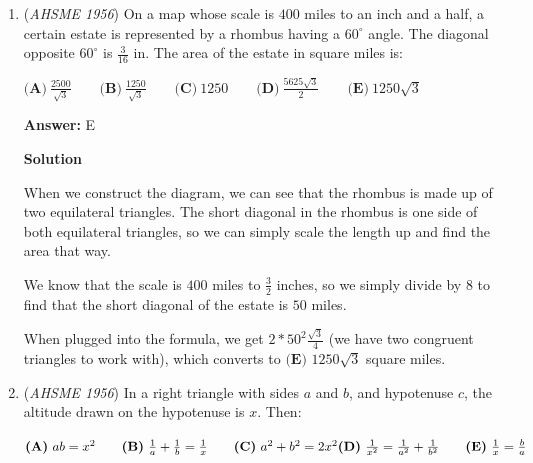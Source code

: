 \begin{enumerate}
 \textbf{Answer: }E



\textbf{Solution}

We can plug in 1, 8, and 49 to see which works.

 $1 = 1 = 1^2$
$1 + 2 + 3 + \cdots + 8 = \frac{8 \cdot 9}{2} = 36 = 6^2$
$1 + 2 + 3 + \cdots + 49 = \frac{49 \cdot 50}{2} = 1225 = 45^2$

 All of these values produce a perfect square for $1 + 2 + \cdots + K,$ so the answer is $\boxed{\textbf{(E)}}.$

 -coolmath34

 


	\item (\textit{AHSME 1956}) On a map whose scale is $400$ miles to an inch and a half, a certain estate is represented by a 
rhombus having a $60^{\circ}$ angle. The diagonal opposite $60^{\circ}$ is $\frac {3}{16}$ in. The area of the estate in square miles is: 


 $\textbf{(A)}\ \frac{2500}{\sqrt{3}}\qquad \textbf{(B)}\ \frac{1250}{\sqrt{3}}\qquad \textbf{(C)}\ 1250\qquad \textbf{(D)}\ \frac{5625\sqrt{3}}{2}\qquad \textbf{(E)}\ 1250\sqrt{3}$

 \textbf{Answer: }E



\textbf{Solution}

When we construct the diagram, we can see that the rhombus is made up of two equilateral triangles. The short diagonal in the rhombus is one side of both equilateral triangles, so we can simply scale the length up and find the area that way.

 We know that the scale is $400$ miles to $\frac{3}{2}$ inches, so we simply divide by $8$ to find that the short diagonal of the estate is $50$ miles.

 When plugged into the formula, we get $2*50^2\frac{\sqrt{3}}{4}$ (we have two congruent triangles to work with), which converts to $\boxed{\textbf{(E) }1250\sqrt{3}}$ square miles.

 


	\item (\textit{AHSME 1956}) In a right triangle with sides $a$ and $b$, and hypotenuse $c$, the altitude drawn on the hypotenuse is $x$. Then: 


 $\textbf{(A)}\ ab = x^2 \qquad \textbf{(B)}\ \frac {1}{a} + \frac {1}{b} = \frac {1}{x} \qquad \textbf{(C)}\ a^2 + b^2 = 2x^2 \\ \textbf{(D)}\ \frac {1}{x^2} = \frac {1}{a^2} + \frac {1}{b^2} \qquad \textbf{(E)}\ \frac {1}{x} = \frac {b}{a}$


\end{enumerate}
